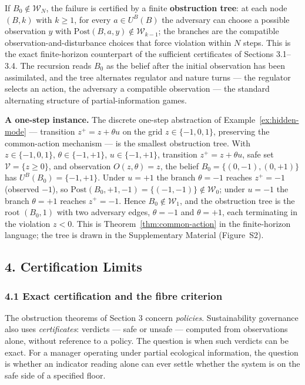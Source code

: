 \documentclass[10pt,twocolumn]{article}
\theoremstyle{definition}
\begin{document}
If \(B_0\notin\mathcal W_N\), the failure is certified by a finite
\textbf{obstruction tree}: at each node \((B,k)\) with \(k\ge1\), for
every \(a\in U^B(B)\) the adversary can choose a possible observation
\(y\) with \(\mathrm{Post}(B,a,y)\notin\mathcal W_{k-1}\); the branches
are the compatible observation-and-disturbance choices that force
violation within \(N\) steps. This is the exact finite-horizon
counterpart of the sufficient certificates of Sections 3.1--3.4. The recursion reads \(B_0\) as the belief after the
initial observation has been assimilated, and the tree alternates
regulator and nature turns --- the regulator selects an action, the
adversary a compatible observation --- the standard alternating
structure of partial-information games.

\textbf{A one-step instance.} The discrete one-step abstraction of
Example~\ref{ex:hidden-mode} --- transition \(z^+ = z + \theta u\) on
the grid \(z \in \{-1,0,1\}\), preserving the common-action mechanism
--- is the smallest obstruction tree. With
\(z\in\{-1,0,1\}\), \(\theta\in\{-1,+1\}\), \(u\in\{-1,+1\}\),
transition \(z^+=z+\theta u\), safe set \(\mathcal V=\{z\ge 0\}\), and
observation \(O(z,\theta)=z\), the belief \(B_0=\{(0,-1),(0,+1)\}\) has
\(U^B(B_0)=\{-1,+1\}\). Under \(u=+1\) the branch \(\theta=-1\) reaches
\(z^+=-1\) (observed \(-1\)), so
\(\mathrm{Post}(B_0,+1,-1)=\{(-1,-1)\}\notin\mathcal W_0\); under
\(u=-1\) the branch \(\theta=+1\) reaches \(z^+=-1\). Hence
\(B_0\notin\mathcal W_1\), and the obstruction tree is the root
\((B_0,1)\) with two adversary edges, \(\theta=-1\) and \(\theta=+1\),
each terminating in the violation \(z<0\). This is
Theorem~\ref{thm:common-action} in the finite-horizon language; the tree is drawn in the Supplementary Material (Figure~S2).





\subsection{4. Certification Limits}\label{certification-limits}

\subsubsection{4.1 Exact certification and the fibre
criterion}\label{exact-certification-and-the-fibre-criterion}

The obstruction theorems of Section 3 concern \emph{policies}.
Sustainability governance also uses \emph{certificates}: verdicts
--- safe or unsafe --- computed from observations alone, without
reference to a policy. The question is when such verdicts can be exact.
For a manager operating under partial ecological information, the question is whether an indicator reading alone can ever settle whether the system is on the safe side of a specified floor.
\end{document}
